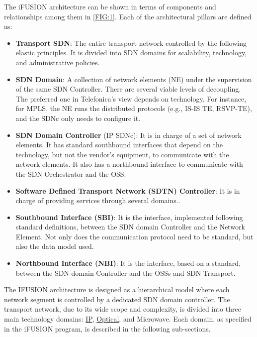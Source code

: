 \documentclass[a4paper,fleqn]{cas-dc}
\begin{document}
The i\uppercase{FUSION} architecture can be shown in terms of components and relationships among them in \cref{FIG:1}. Each of the architectural pillars are defined as:

\begin{itemize}
\item \textbf{Transport SDN}: The entire transport network controlled by the following elastic principles. It is divided into SDN domains for scalability, technology, and administrative policies.

\item \textbf{SDN Domain}: A collection of network elements (NE) under the supervision of the same SDN Controller. There are several viable levels of decoupling. The preferred one in Telefonica's view depends on technology. For instance, for MPLS, the NE runs the distributed protocols (e.g., IS-IS TE, RSVP-TE), and the SDNc only needs to configure it.

\item \textbf{SDN Domain Controller} (IP SDNc): It is in charge of a set of network elements. It has standard southbound interfaces that depend on the technology, but not the vendor's equipment, to communicate with the network elements. It also has a northbound interface to communicate with the SDN Orchestrator and the OSS.

\item \textbf{Software Defined Transport Network (SDTN) Controller}: It is in charge of providing services through several domains.. 

\item \textbf{Southbound Interface (SBI)}: It is the interface, implemented following standard definitions, between the SDN domain Controller and the Network Element. Not only does the communication protocol need to be standard, but also the data model used.

\item \textbf{Northbound Interface (NBI)}: It is the interface, based on a standard, between the SDN domain Controller and the OSSs and SDN Transport.

\end{itemize}

The \uppercase{iFUSION} architecture is designed as a hierarchical model where each network segment is controlled by a dedicated SDN domain controller. The transport network, due to its wide scope and complexity, is divided into three main technology domains: \hyperref[section:ip]{IP},  \hyperref[section:dwdm]{Optical}, and Microwave. Each domain, as specified in the i\uppercase{FUSION} program, is described in the following sub-sections.   
\end{document}
